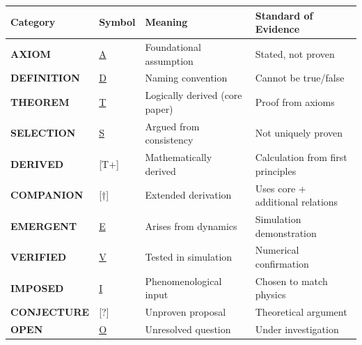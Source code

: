 \documentclass[
  11pt,
  letterpaper,
  twoside,
  openright]{book}
\begin{document}
\begin{longtable}[]{@{}
  >{\raggedright\arraybackslash}p{}
  >{\raggedright\arraybackslash}p{}
  >{\raggedright\arraybackslash}p{}
  >{\raggedright\arraybackslash}p{}@{}}
\toprule\noalign{}
\begin{minipage}[b]{\linewidth}\raggedright
Category
\end{minipage} & \begin{minipage}[b]{\linewidth}\raggedright
Symbol
\end{minipage} & \begin{minipage}[b]{\linewidth}\raggedright
Meaning
\end{minipage} & \begin{minipage}[b]{\linewidth}\raggedright
Standard of Evidence
\end{minipage} \\
\midrule\noalign{}
\endhead
\bottomrule\noalign{}
\endlastfoot
\textbf{AXIOM} & \hyperref[a]{A} & Foundational assumption & Stated, not
proven \\
\textbf{DEFINITION} & \hyperref[d]{D} & Naming convention & Cannot be
true/false \\
\textbf{THEOREM} & \hyperref[t]{T} & Logically derived (core paper) &
Proof from axioms \\
\textbf{SELECTION} & \hyperref[s]{S} & Argued from consistency & Not
uniquely proven \\
\textbf{DERIVED} & {[}T+{]} & Mathematically derived & Calculation from
first principles \\
\textbf{COMPANION} & {[}†{]} & Extended derivation & Uses core +
additional relations \\
\textbf{EMERGENT} & \hyperref[e]{E} & Arises from dynamics & Simulation
demonstration \\
\textbf{VERIFIED} & \hyperref[v]{V} & Tested in simulation & Numerical
confirmation \\
\textbf{IMPOSED} & \hyperref[i]{I} & Phenomenological input & Chosen to
match physics \\
\textbf{CONJECTURE} & {[}?{]} & Unproven proposal & Theoretical
argument \\
\textbf{OPEN} & \hyperref[o]{O} & Unresolved question & Under
investigation \\
\end{longtable}
\end{document}
